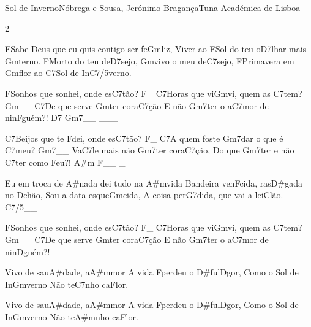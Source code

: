 \begin{musica}{Sol de Inverno}{Nóbrega e Sousa, Jerónimo Bragança}{Tuna Académica de Lisboa}
\begin{multicols}{2}

\ac{F}{Sa}be Deus que eu quis contigo ser fe\ac{Gm}{liz},
Viver ao \ac{F}{Sol} do teu o\ac{D7}{lhar} mais \ac{Gm}{ter}no.
\ac{F}{Mor}to do teu de\ac{D7}{se}jo, \ac{Gm}{vi}vo o meu de\ac{C7}{se}jo,
\ac{F}{Pri}mavera em \ac{Gm}{flor} ao \ac{C7}{Sol} de In\ac{C7/5}{ver}no.

\ac{F}{So}nhos que sonhei, onde es\ac{C7}{tão}? \ac{F}{}_
\ac{C7}{Ho}ras que vi\ac{Gm}{vi}, quem as \ac{C7}{tem}? \ac{Gm}{}__
\ac{C7}{De} que serve \ac{Gm}{ter} cora\ac{C7}{ção}
E não \ac{Gm7}{ter} o a\ac{C7}{mor} de nin\ac{F}{guém}?! \ac{D7 Gm7}{}__ ___

\ac{C7}{Bei}jos que te \ac{F}{dei}, onde es\ac{C7}{tão}? \ac{F}{}_
\ac{C7}{A} quem foste \ac{Gm7}{dar} o que é \ac{C7}{meu}? \ac{Gm7}{}__
Va\ac{C7}{le} mais não \ac{Gm7}{ter} cora\ac{C7}{ção},
Do que \ac{Gm7}{ter} e não \ac{C7}{ter} como \ac{F}{eu}?! \ac{A#m F}{}__ _

Eu em troca de \ac{A#}{na}da dei tudo na \ac{A#m}{vi}da
Bandeira ven\ac{F}{ci}da, ras\ac{D#}{ga}da no \ac{D}{chão},
Sou a data esque\ac{Gm}{ci}da,
A coisa per\ac{G7}{di}da, que vai a lei\ac{C}{lão}. \ac{C7/5}{}__

\ac{F}{So}nhos que sonhei, onde es\ac{C7}{tão}? \ac{F}{}_
\ac{C7}{Ho}ras que vi\ac{Gm}{vi}, quem as \ac{C7}{tem}? \ac{Gm}{}__
\ac{C7}{De} que serve \ac{Gm}{ter} cora\ac{C7}{ção}
E não \ac{Gm7}{ter} o a\ac{C7}{mor} de nin\ac{D}{guém}?!

Vivo de sau\ac{A#}{da}de, a\ac{A#m}{mor}
A vida \ac{F}{per}deu o \ac{D#}{fu}l\ac{D}{gor},
Como o Sol de In\ac{Gm}{ver}no
Não te\ac{C7}{nho} ca\ac{F}{lor}.


Vivo de sau\ac{A#}{da}de, a\ac{A#m}{mor}
A vida \ac{F}{per}deu o \ac{D#}{fu}l\ac{D}{gor},
Como o Sol de In\ac{Gm}{ver}no
Não te\ac{A#m}{nho} ca\ac{F}{lor}.
\end{multicols}

\end{musica}
